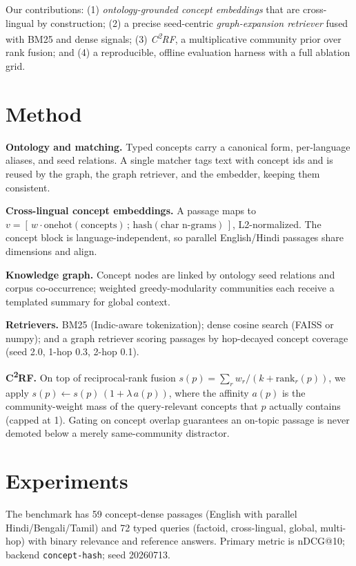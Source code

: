\documentclass[10pt,twocolumn]{article}
\begin{document}
Our contributions: (1) \emph{ontology-grounded concept embeddings} that are cross-lingual by
construction; (2) a precise seed-centric \emph{graph-expansion retriever} fused with BM25 and dense
signals; (3) \emph{C\textsuperscript{2}RF}, a multiplicative community prior over rank fusion; and (4) a
reproducible, offline evaluation harness with a full ablation grid.

\section{Method}
\textbf{Ontology and matching.} Typed concepts carry a canonical form, per-language aliases, and seed
relations. A single matcher tags text with concept ids and is reused by the graph, the graph retriever,
and the embedder, keeping them consistent.

\textbf{Cross-lingual concept embeddings.} A passage maps to
$v=[\,w\cdot\mathrm{onehot}(\mathrm{concepts})\,;\,\mathrm{hash}(\text{char n-grams})\,]$, L2-normalized.
The concept block is language-independent, so parallel English/Hindi passages share dimensions and align.

\textbf{Knowledge graph.} Concept nodes are linked by ontology seed relations and corpus co-occurrence;
weighted greedy-modularity communities each receive a templated summary for global context.

\textbf{Retrievers.} BM25 (Indic-aware tokenization); dense cosine search (FAISS or numpy); and a graph
retriever scoring passages by hop-decayed concept coverage (seed 2.0, 1-hop 0.3, 2-hop 0.1).

\textbf{C\textsuperscript{2}RF.} On top of reciprocal-rank fusion
$s(p)=\sum_r w_r/(k+\mathrm{rank}_r(p))$, we apply $s(p)\leftarrow s(p)\,(1+\lambda\,a(p))$, where the
affinity $a(p)$ is the community-weight mass of the query-relevant concepts that $p$ actually contains
(capped at 1). Gating on concept overlap guarantees an on-topic passage is never demoted below a merely
same-community distractor.

\section{Experiments}
The benchmark has 59 concept-dense passages (English with parallel Hindi/Bengali/Tamil) and 72 typed
queries (factoid, cross-lingual, global, multi-hop) with binary relevance and reference answers. Primary
metric is nDCG@10; backend \texttt{concept-hash}; seed 20260713.
\end{document}
